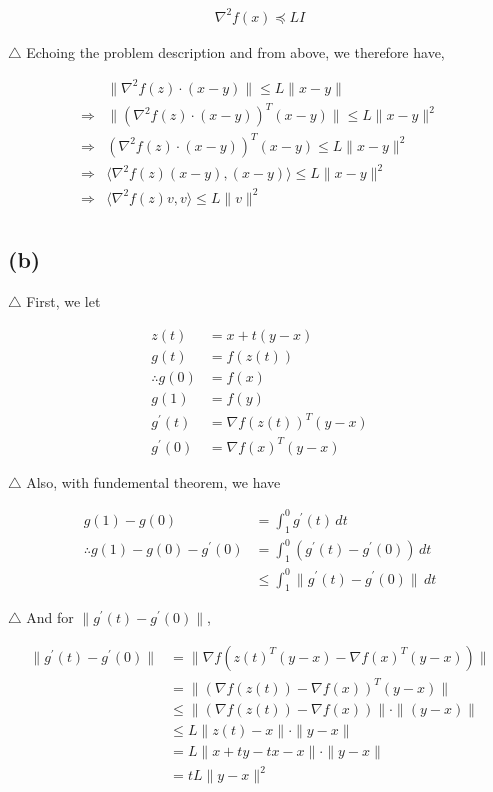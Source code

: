 \documentclass[a4paper,12pt]{article}
\begin{document}
\begin{align*}
   \nabla^{2}f(x) \preceq LI
\end{align*}

\noindent $\triangle$
Echoing the problem description and from above, we therefore have,

\begin{align*}
   &\|\nabla^{2}f(z) \cdot (x-y)\|\leq L \|x-y\| \\
   \Rightarrow&
   \|(\nabla^{2}f(z) \cdot (x-y))^{T}(x-y)\|\leq L \|x-y\|^{2} \\
   \Rightarrow&
   (\nabla^{2}f(z) \cdot (x-y))^{T}(x-y)\leq L \|x-y\|^{2} \\
   \Rightarrow&
   \langle \nabla^{2}f(z)(x-y),(x-y) \rangle \leq L \|x-y\|^{2} \\
   \Rightarrow&
   \langle \nabla^{2}f(z)v,v \rangle \leq L \|v\|^{2} \\
\end{align*}

\subsection*{(b)}
\noindent $\triangle$
First, we let

\begin{align*}
   z(t) &= x + t(y-x)\\
   g(t) &= f(z(t))\\
   \therefore  
   g(0) &=f(x) \\
   g(1) &=f(y) \\
   g^{'}(t) &= \nabla f(z(t))^{T}(y-x) \\
   g^{'}(0) &= \nabla f(x)^{T}(y-x)
\end{align*}

\noindent $\triangle$
Also, with fundemental theorem, we have

\begin{align*}
   g(1) - g(0) &= 
    \int_{1}^{0} g^{'}(t) \,dt \\
   \therefore g(1) - g(0) - g^{'}(0) &= \int_{1}^{0} (g^{'}(t)-g^{'}(0))\,dt \\
   &\leq \int_{1}^{0} \|g^{'}(t)-g^{'}(0)\| \,dt
\end{align*}

\noindent $\triangle$
And for $\|g^{'}(t)-g^{'}(0)\|$, 

\begin{align*}
   \|g^{'}(t)-g^{'}(0)\| &= \| \nabla f(z(t)^{T}(y-x) - \nabla f(x)^{T}(y-x)) \| \\
   &= \| (\nabla f(z(t)) - \nabla f(x))^{T}(y-x) \| \\
   &\leq \| (\nabla f(z(t)) - \nabla f(x)) \| \cdot \|(y-x) \| \\
   &\leq L \|z(t) - x \| \cdot \|y-x \| \\
   &=L\| x+ty - tx - x\| \cdot \|y-x\| \\
   &=tL \|y-x\|^{2}
\end{align*}
\end{document}
